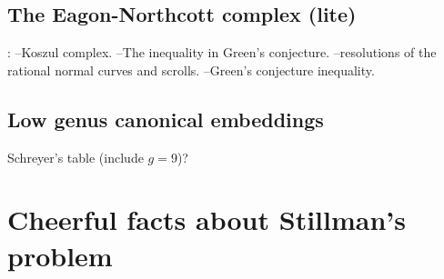 \subsection{The Eagon-Northcott complex (lite)}: 
--Koszul complex.
--The inequality in Green's conjecture.
--resolutions of the rational normal curves and scrolls.
--Green's conjecture inequality.

\subsection{Low genus canonical embeddings} Schreyer's table (include $g=9$)?

\section{Cheerful facts about Stillman's problem}

